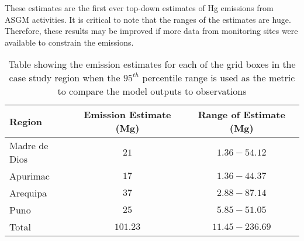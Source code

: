 
\begin{flushleft}
    These estimates are the first ever top-down estimates of Hg emissions from ASGM activities. It is critical to note that the ranges of the estimates are huge. Therefore, these results may be improved if more data from monitoring sites were available to constrain the emissions. 
\end{flushleft}    
\begin{table}[H]
\caption{Table showing the emission estimates for each of the grid boxes in the case study region when the $95^{th}$ percentile range is used as the metric to compare the model outputs to observations}
    \label{tab:MCMC_estimates}
\begin{tabular}{lcc}

\textbf{Region}        & \textbf{Emission Estimate (Mg)}  &     \textbf{Range of Estimate (Mg)}                      \\
\hline
Madre de Dios          & $21$                               & $1.36 - 54.12$\\

Apurimac               & $17$                               & $1.36 - 44.37$\\

Arequipa               & $37$                               & $2.88 - 87.14$\\

Puno                    & $25$                              & $5.85 - 51.05$\\
\hline
Total                  & $101.23$                            &  $11.45 - 236.69$ \\
\hline
\end{tabular}
\centering
\end{table}

